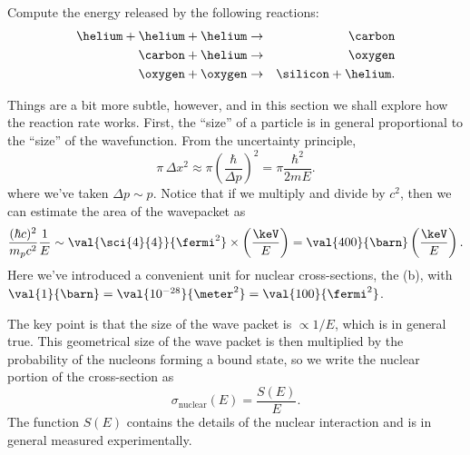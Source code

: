 \begin{exercisebox}
\label{ex.energy-release}
Compute the energy released by the following reactions:
\begin{eqnarray*}
\helium+\helium+\helium &\to& \carbon\\
\carbon + \helium &\to& \oxygen\\
\oxygen + \oxygen &\to& \silicon + \helium.
\end{eqnarray*}
\end{exercisebox}

 Things are a bit more subtle, however, and in this section we shall explore how the reaction rate works. First, the ``size'' of a particle is in general proportional to the ``size'' of the wavefunction. From the uncertainty principle, 
\[\pi\,\Delta x^{2} \approx \pi \left(\frac{\hbar}{\Delta p}\right)^{2} = \pi\frac{\hbar^{2}}{2mE}.\]
where we've taken $\Delta p\sim p$.
Notice that if we multiply and divide by $c^{2}$, then we can estimate the area of the wavepacket as
\[
	\frac{(\hbar c)^{2}}{m_{p} c^{2}} \frac{1}{E} \sim \val{\sci{4}{4}}{\fermi^{2}} \times \left(\frac{\keV}{E}\right) = \val{400}{\barn}\left(\frac{\keV}{E}\right).
\]	
Here we've introduced a convenient unit for nuclear cross-sections, the  (b), with $\val{1}{\barn} = \val{10^{-28}}{\meter^{2}} = \val{100}{\fermi^{2}}$.

The key point is that the size of the wave packet is $\propto 1/E$, which is in general true. This geometrical size of the wave packet is then multiplied by the probability of the nucleons forming a bound state, so we write the nuclear portion of the cross-section as
\begin{equation}\label{e.nuclear-cross-section}
	\sigma_{\mathrm{nuclear}}(E) = \frac{S(E)}{E}.
\end{equation}
The function $S(E)$ contains the details of the nuclear interaction and is in general measured experimentally.

